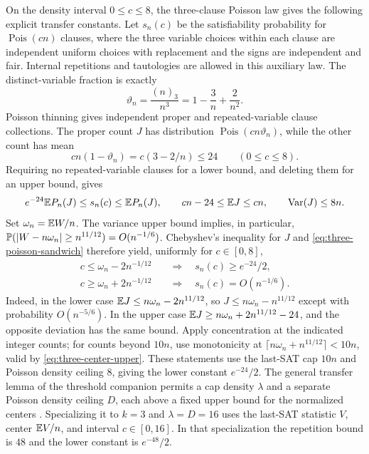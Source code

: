 On the density interval $0\le c\le8$, the three-clause Poisson law gives
the following explicit transfer constants. Let $s_n(c)$ be
the satisfiability probability for $\operatorname{Pois}(cn)$ clauses,
where the three variable choices within each clause are independent
uniform choices with replacement and the signs are independent and fair.
Internal repetitions and tautologies are allowed in this auxiliary law.
The distinct-variable fraction is exactly
\[
 \vartheta_n=\frac{(n)_3}{n^3}=1-\frac3n+\frac2{n^2}.
\]
Poisson thinning gives independent proper and repeated-variable clause
collections. The proper count $J$ has distribution
$\operatorname{Pois}(cn\vartheta_n)$, while the other count has mean
\[
 cn(1-\vartheta_n)=c(3-2/n)\le24\qquad(0\le c\le8).
\]
Requiring no repeated-variable clauses for a lower bound, and deleting
them for an upper bound, gives
\begin{equation}\label{eq:three-poisson-sandwich}
 e^{-24}\mathbb E P_n(J)\le s_n(c)\le\mathbb E P_n(J),\qquad
 cn-24\le\mathbb E J\le cn,\qquad \operatorname{Var}(J)\le8n.
\end{equation}
Set $\omega_n=\mathbb E W/n$. The variance upper bound implies, in particular,
$\mathbb P(|W-n\omega_n|\ge n^{11/12})=O(n^{-1/6})$.
Chebyshev's inequality for $J$ and \eqref{eq:three-poisson-sandwich}
therefore yield, uniformly for $c\in[0,8]$,
\begin{align}
 c\le\omega_n-2n^{-1/12}
 &\quad\Longrightarrow\quad s_n(c)\ge e^{-24}/2,
 \label{eq:three-poisson-lower}\\
 c\ge\omega_n+2n^{-1/12}
 &\quad\Longrightarrow\quad s_n(c)=O(n^{-1/6}).
 \label{eq:three-poisson-upper}
\end{align}
Indeed, in the lower case $\mathbb E J\le n\omega_n-2n^{11/12}$, so
$J\le n\omega_n-n^{11/12}$ except with probability $O(n^{-5/6})$.
In the upper case $\mathbb E J\ge n\omega_n+2n^{11/12}-24$, and the opposite
deviation has the same bound. Apply concentration at the indicated
integer counts; for counts beyond $10n$, use monotonicity at
$\lceil n\omega_n+n^{11/12}\rceil<10n$, valid by
\eqref{eq:three-center-upper}.
These statements use the last-SAT cap $10n$ and Poisson density ceiling
$8$, giving the lower constant $e^{-24}/2$.
The general transfer lemma of the threshold companion permits a cap
density $\lambda$ and a separate Poisson density ceiling $D$, each above
a fixed upper bound for the normalized centers
\cite[Lemma~\ThresholdTransfer]{FixedKThreshold}. Specializing it to
$k=3$ and $\lambda=D=16$ uses the last-SAT statistic $V$, center
$\mathbb E V/n$, and interval $c\in[0,16]$. In that specialization the
repetition bound is $48$ and the lower constant is $e^{-48}/2$.
